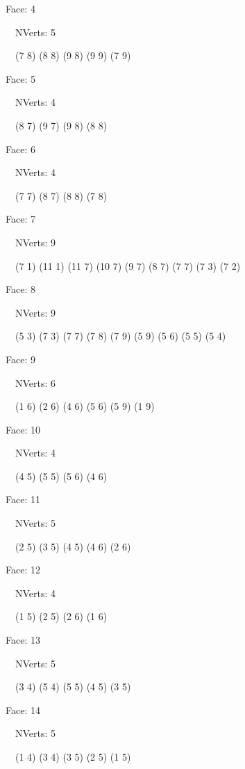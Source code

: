 \documentclass{article}
\begin{document}
{\footnotesize 

Face: 4

\   \    NVerts: 5

 \   \   (7 8) (8 8) (9 8) (9 9) (7 9)}

{\footnotesize 

Face: 5

\   \    NVerts: 4

 \   \   (8 7) (9 7) (9 8) (8 8)}

{\footnotesize 

Face: 6

\   \    NVerts: 4

 \   \   (7 7) (8 7) (8 8) (7 8)}

{\footnotesize 

Face: 7

\   \    NVerts: 9

 \   \   (7 1) (11 1) (11 7) (10 7) (9 7) (8 7) (7 7) (7 3) (7 2)}

{\footnotesize 

Face: 8

\   \    NVerts: 9

 \   \   (5 3) (7 3) (7 7) (7 8) (7 9) (5 9) (5 6) (5 5) (5 4)}

{\footnotesize 

Face: 9

\   \    NVerts: 6

 \   \   (1 6) (2 6) (4 6) (5 6) (5 9) (1 9)}

{\footnotesize 

Face: 10

\   \    NVerts: 4

 \   \   (4 5) (5 5) (5 6) (4 6)}

{\footnotesize 

Face: 11

\   \    NVerts: 5

 \   \   (2 5) (3 5) (4 5) (4 6) (2 6)}

{\footnotesize 

Face: 12

\   \    NVerts: 4

 \   \   (1 5) (2 5) (2 6) (1 6)}

{\footnotesize 

Face: 13

\   \    NVerts: 5

 \   \   (3 4) (5 4) (5 5) (4 5) (3 5)}

{\footnotesize 

Face: 14

\   \    NVerts: 5

 \   \   (1 4) (3 4) (3 5) (2 5) (1 5)}
\end{document}
